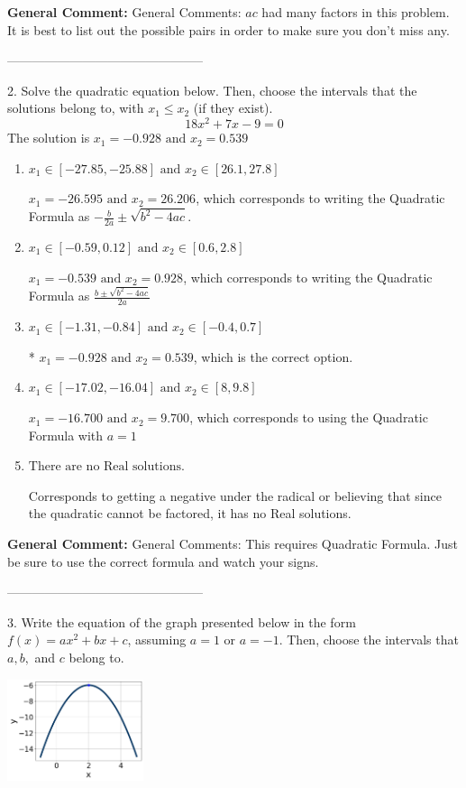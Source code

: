 \documentclass{extbook}[14pt]
\begin{document}
\textbf{General Comment:} General Comments: $ac$ had many factors in this problem. It is best to list out the possible pairs in order to make sure you don't miss any. 

-----------------------------------------------

2. Solve the quadratic equation below. Then, choose the intervals that the solutions belong to, with $x_1 \leq x_2$ (if they exist).
\[ 18x^{2} +7 x -9 = 0 \] 
The solution is $ x_1 = -0.928 \text{ and } x_2 = 0.539 $ 

\begin{enumerate}[label=\Alph*.] 
\item $ x_1 \in [-27.85, -25.88] \text{ and } x_2 \in [26.1, 27.8] $ 

  $x_1 = -26.595 \text{ and } x_2 = 26.206$, which corresponds to writing the Quadratic Formula as $-\frac{b}{2a} \pm \sqrt{b^2 - 4ac}$. 
\item $ x_1 \in [-0.59, 0.12] \text{ and } x_2 \in [0.6, 2.8] $ 

  $x_1 = -0.539 \text{ and } x_2 = 0.928$, which corresponds to writing the Quadratic Formula as $\frac{b \pm \sqrt{b^2 - 4ac}}{2a}$ 
\item $ x_1 \in [-1.31, -0.84] \text{ and } x_2 \in [-0.4, 0.7] $ 

 * $x_1 = -0.928 \text{ and } x_2 = 0.539$, which is the correct option. 
\item $ x_1 \in [-17.02, -16.04] \text{ and } x_2 \in [8, 9.8] $ 

  $x_1 = -16.700 \text{ and } x_2 = 9.700$, which corresponds to using the Quadratic Formula with $a=1$ 
\item $ \text{There are no Real solutions.} $ 

 Corresponds to getting a negative under the radical or believing that since the quadratic cannot be factored, it has no Real solutions. 
\end{enumerate} 
 
\textbf{General Comment:} General Comments: This requires Quadratic Formula. Just be sure to use the correct formula and watch your signs. 

-----------------------------------------------

3. Write the equation of the graph presented below in the form $f(x)=ax^2+bx+c$, assuming  $a=1$ or $a=-1$. Then, choose the intervals that $a, b,$ and $c$ belong to.
\begin{center} \includegraphics[width=0.3\textwidth]{../Figures/quadraticGraphToEquationC.png} \end{center} 
\end{document}
